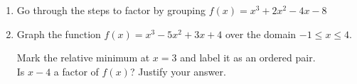 \documentclass[12pt, twoside]{article}
\begin{document}
\begin{enumerate}
\item Go through the steps to factor by grouping $f(x) = x^3+2x^2-4x-8$

\newpage
\item Graph the function $f(x) = x^{3}-5x^{2}+3x+4$ over the domain $-1 \leq x \leq 4$. 
\begin{center}
    \end{center}
Mark the relative minimum at $x=3$ and label it as an ordered pair. \\[1cm]
Is $x-4$ a factor of $f(x)$? Justify your answer.

\end{enumerate}
\end{document}

